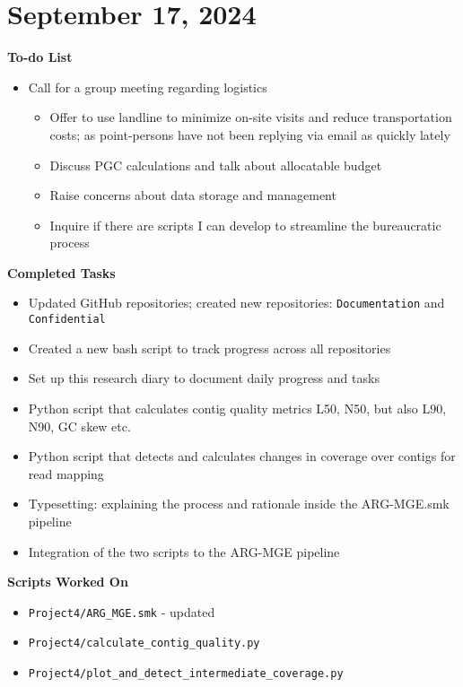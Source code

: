 \documentclass[11pt]{report}
\newcommand{\done}{\checkmark}
\newcommand{\moved}{\faArrowCircleRight}
\begin{document}
{\newpage
\onecolumn


\onecolumn
\newpage


\section{September 17, 2024}

\textbf{To-do List}
\begin{itemize}
	\item [\moved] Call for a group meeting regarding logistics
	
	\begin{itemize}
		\item [\moved] Offer to use landline to minimize on-site visits and reduce transportation costs; as point-persons have not been replying via email as quickly lately
		\item [\moved] Discuss PGC calculations and talk about allocatable budget
		\item [\moved] Raise concerns about data storage and management
		\item [\moved] Inquire if there are scripts I can develop to streamline the bureaucratic process
	\end{itemize}
\end{itemize}

\textbf{Completed Tasks}
\begin{itemize}
	\item [\done] Updated GitHub repositories; created new repositories: \texttt{Documentation} and \texttt{Confidential}
	\item [\done] Created a new bash script to track progress across all repositories
	\item [\done] Set up this research diary to document daily progress and tasks
	\item [\done] Python script that calculates contig quality metrics L50, N50, but also L90, N90, GC skew etc.
	\item [\done] Python script that detects and calculates changes in coverage over contigs for read mapping
	\item [\done] Typesetting: explaining the process and rationale inside the ARG-MGE.smk pipeline
	\item [\done] Integration of the two scripts to the ARG-MGE pipeline
	
\end{itemize}

\textbf{Scripts Worked On}
\begin{itemize}
	\item \texttt{Project4/ARG\_MGE.smk} - updated
	\item [\done] \texttt  {Project4/calculate\_contig\_quality.py} 
	\item [\done] \texttt  {Project4/plot\_and\_detect\_intermediate\_coverage.py} 
\end{itemize}


}
\end{document}
